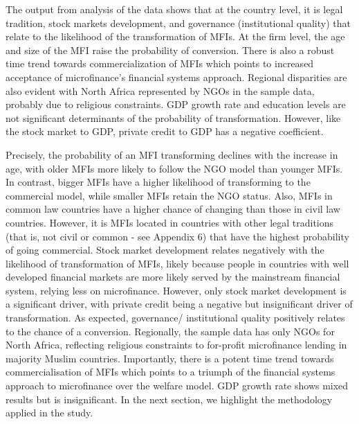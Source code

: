 \documentclass[a4paper,nobind]{templates/ociamthesis}
\begin{document}
The output from analysis of the data shows that at the country level, it is legal tradition, stock markets development, and governance (institutional quality) that relate to the likelihood of the transformation of MFIs. At the firm level, the age and size of the MFI raise the probability of conversion. There is also a robust time trend towards commercialization of MFIs which points to increased acceptance of microfinance's financial systems approach. Regional disparities are also evident with North Africa represented by NGOs in the sample data, probably due to religious constraints. GDP growth rate and education levels are not significant determinants of the probability of transformation. However, like the stock market to GDP, private credit to GDP has a negative coefficient.

Precisely, the probability of an MFI transforming declines with the increase in age, with older MFIs more likely to follow the NGO model than younger MFIs. In contrast, bigger MFIs have a higher likelihood of transforming to the commercial model, while smaller MFIs retain the NGO status. Also, MFIs in common law countries have a higher chance of changing than those in civil law countries. However, it is MFIs located in countries with other legal traditions (that is, not civil or common - see Appendix 6) that have the highest probability of going commercial. Stock market development relates negatively with the likelihood of transformation of MFIs, likely because people in countries with well developed financial markets are more likely served by the mainstream financial system, relying less on microfinance. However, only stock market development is a significant driver, with private credit being a negative but insignificant driver of transformation. As expected, governance/ institutional quality positively relates to the chance of a conversion. Regionally, the sample data has only NGOs for North Africa, reflecting religious constraints to for-profit microfinance lending in majority Muslim countries. Importantly, there is a potent time trend towards commercialisation of MFIs which points to a triumph of the financial systems approach to microfinance over the welfare model. GDP growth rate shows mixed results but is insignificant. In the next section, we highlight the methodology applied in the study.
\end{document}

